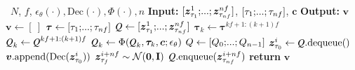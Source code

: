 \begin{algorithm}[h]
    \caption{FIFO-Diffusion with latent partitioning~(\cref{subsec:latent_partitioning})}
    \label{alg:fifo_algorithm_lp}
    \begin{algorithmic} 
        \Require~$N$, $f$, $\epsilon_\theta(\cdot), \text{Dec}(\cdot), \Phi(\cdot), n$ 
        \State \textbf{Input:} $[\gz_{\tau_1}^1;\text{\myldots};\gz_{\tau_{nf}}^{nf}]$, $[\tau_1;\text{\myldots};\tau_{nf}]$, $\bm{c}$
        \State \textbf{Output:} $\bm{v}$
        \State $\bm{v} \leftarrow [~]$
        \State $\bm{\tau} \leftarrow [\tau_{1};\text{\myldots};\tau_{nf}]$
        \State $\Q \leftarrow [\gz_{\tau_{1}}^{1};\text{\myldots};\gz_{\tau_{nf}}^{nf}]$
        \vspace{2mm}
                \State $\bm{\tau}_k \leftarrow \bm{\tau}^{kf+1:(k+1)f}$
                \State $\Q_k \leftarrow \Q^{kf+1:(k+1)f}$
                \vspace{2mm}
                \State $\Q_k \leftarrow \Phi(\Q_k,\bm{\tau}_k,\bm{c};\epsilon_\theta)$ 
            \EndFor
            \State $Q \leftarrow [Q_0;\text{\myldots};Q_{n-1}]$
            \State $\gz_{\tau_{0}}^{i} \leftarrow \Q\text{.dequeue}()$
            \State $\bm{v}\text{.append}(\text{Dec}(\bm{z}_{\tau_0}^i))$ 
            \vspace{1mm}
            \State $\bm{z}_{\tau_f}^{i+nf}\sim \mathcal{N}(\mathbf{0},\mathbf{I})$
            \State $\Q\text{.enqueue}(\gz_{\tau_{nf}}^{i+nf})$
        \EndFor
        \State \textbf{return} $\bm{v}$
    \end{algorithmic}
\end{algorithm}
\vspace{-4mm}

